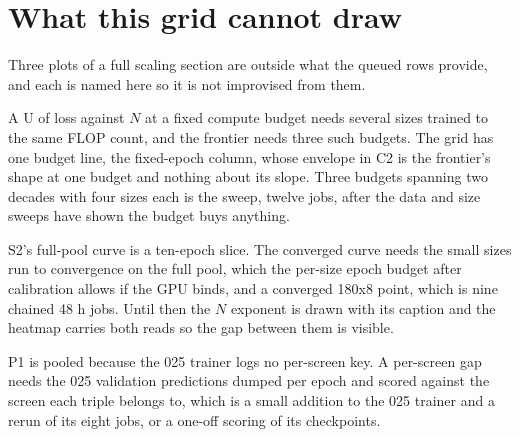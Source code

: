 
\section{What this grid cannot draw}
\label{sec:beyond}

Three plots of a full scaling section are outside what the queued rows provide,
and each is named here so it is not improvised from them.

A U of loss against $N$ at a fixed compute budget needs several sizes trained
to the same FLOP count, and the frontier needs three such budgets. The grid has
one budget line, the fixed-epoch column, whose envelope in C2 is the frontier's
shape at one budget and nothing about its slope. Three budgets spanning two
decades with four sizes each is the sweep, twelve jobs, after the data and size
sweeps have shown the budget buys anything.

S2's full-pool curve is a ten-epoch slice. The converged curve needs the small
sizes run to convergence on the full pool, which the per-size epoch budget after
calibration allows if the GPU binds, and a converged 180x8 point, which is nine
chained 48 h jobs. Until then the $N$ exponent is drawn with its caption and the
heatmap carries both reads so the gap between them is visible.

P1 is pooled because the 025 trainer logs no per-screen key. A per-screen gap
needs the 025 validation predictions dumped per epoch and scored against the
screen each triple belongs to, which is a small addition to the 025 trainer and
a rerun of its eight jobs, or a one-off scoring of its checkpoints.
